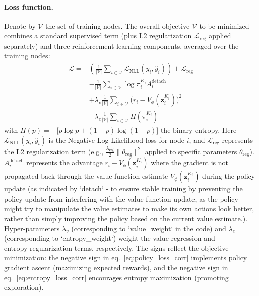 \documentclass{gdl}
\begin{document}
\paragraph{Loss function.}
Denote by $\mathcal{V}$ the set of training nodes. The overall objective $\mathcal{V}$ to be minimized combines a standard supervised term (plus L2 regularization $\mathcal{L}_{\text{reg}}$ applied separately) and three reinforcement‑learning components, averaged over the training nodes:
\begin{align}
\mathcal{L} = &\left( \frac{1}{|\mathcal{V}|} \sum_{i\in\mathcal{V}} \mathcal{L}_{\text{NLL}}(y_i, \hat{y}_i) \right) + \mathcal{L}_{\text{reg}} \label{eq:supervised_loss_corr}\\
 &- \frac{1}{|\mathcal{V}|} \sum_{i\in\mathcal{V}} \log\pi_{i}^{K_i} A_i^{\text{detach}} \label{eq:policy_loss_corr}\\
 &+ \lambda_v \frac{1}{|\mathcal{V}|} \sum_{i\in\mathcal{V}} \bigl(r_i - V_{\phi}(\mathbf{z}_i^{K_i})\bigr)^2 \label{eq:value_loss_corr}\\
 &- \lambda_e \frac{1}{|\mathcal{V}|} \sum_{i\in\mathcal{V}} H(\pi_i^{K_i}) \label{eq:entropy_loss_corr}
\end{align}
with $H(p)= -\bigl[p\log p + (1-p)\log(1-p)\bigr]$ the binary entropy. Here $\mathcal{L}_{\text{NLL}}(y_i, \hat{y}_i)$ is the Negative Log-Likelihood loss for node $i$, and $\mathcal{L}_{\text{reg}}$ represents the L2 regularization term (e.g., $\frac{\lambda_{\text{reg}}}{2} \lVert\theta_{\text{reg}}\rVert^2$ applied to specific parameters $\theta_{\text{reg}}$). $A_i^{\text{detach}}$ represents the advantage $r_i - V_{\phi}(\mathbf{z}_i^{K_i})$ where the gradient is not propagated back through the value function estimate $V_{\phi}(\mathbf{z}_i^{K_i})$ during the policy update (as indicated by `detach` - to ensure stable training by preventing the policy update from interfering with the value function update, as the policy might try to manipulate the value estimates to make its own actions look better, rather than simply improving the policy based on the current value estimate.). Hyper‑parameters $\lambda_v$ (corresponding to `value\_weight` in the code) and $\lambda_e$ (corresponding to `entropy\_weight`) weight the value‑regression and entropy‑regularization terms, respectively. The signs reflect the objective minimization: the negative sign in eq.~\eqref{eq:policy_loss_corr} implements policy gradient ascent (maximizing expected rewards), and the negative sign in eq.~\eqref{eq:entropy_loss_corr} encourages entropy maximization (promoting exploration).
    
\end{document}
